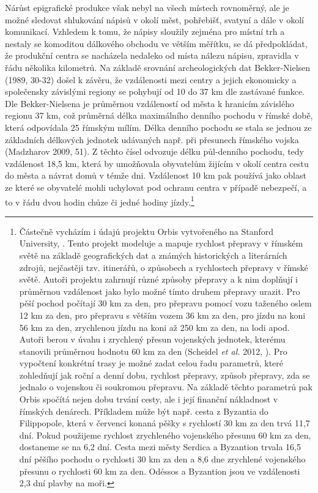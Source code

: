 Nárůst epigrafické produkce však nebyl na všech místech rovnoměrný, ale je možné sledovat shlukování nápisů v okolí měst, pohřebišť, svatyní a dále v okolí komunikací. Vzhledem k tomu, že nápisy sloužily zejména pro místní trh a nestaly se komoditou dálkového obchodu ve větším měřítku, se dá předpokládat, že produkční centra se nacházela nedaleko od místa nálezu nápisu, zpravidla v řádu několika kilometrů. Na základě srovnání archeologických dat Bekker-Nielsen (1989, 30-32) došel k závěru, že vzdálenosti mezi centry a jejich ekonomicky a společensky závislými regiony se pohybují od 10 do 37 km dle zastávané funkce. Dle Bekker-Nielsena je průměrnou vzdáleností od města k hranicím závislého regionu 37 km, což průměrná délka maximálního denního pochodu v římské době, která odpovídala 25 římským mílím. Délka denního pochodu se stala se jednou ze základních délkových jednotek udávaných např. při přesunech římského vojska (Madzharov 2009, 51). Z těchto čísel odvozuje délku půl-denního pochodu, tedy vzdálenost 18,5 km, která by umožňovala obyvatelům žijícím v okolí centra cestu do města a návrat domů v témže dni. Vzdálenost 10 km pak používá jako oblast ze které se obyvatelé mohli uchylovat pod ochranu centra v případě nebezpečí, a to v řádu dvou hodin chůze či jedné hodiny jízdy.\footnote{Částečně vycházím i údajů projektu Orbis vytvořeného na Stanford University, \from[url22]. Tento projekt modeluje a mapuje rychlost přepravy v římském světě na základě geografických dat a známých historických a literárních zdrojů, nejčastěji tzv. itinerářů, o způsobech a rychlostech přepravy v římské světě. Autoři projektu zahrnují různé způsoby přepravy a k nim doplňují i průměrnou vzdálenost jako bylo možné tímto druhem přepravy urazit. Pro pěší pochod počítají 30 km za den, pro přepravu pomocí vozu taženého oslem 12 km za den, pro přepravu s větším vozem 36 km za den, pro jízdu na koni 56 km za den, zrychlenou jízdu na koni až 250 km za den, na lodi apod. Autoři berou v úvahu i zrychlený přesun vojenských jednotek, kterému stanovili průměrnou hodnotu 60 km za den (Scheidel {\em et al.} 2012, \from[url23]). Pro vypočtení konkrétní trasy je možné zadat celou řadu parametrů, které zohledňují jak roční a denní dobu, rychlost přepravy, způsob přepravy, zda se jednalo o vojenskou či soukromou přepravu. Na základě těchto parametrů pak Orbis spočítá nejen dobu trvání cesty, ale i její finanční nákladnost v římských denárech. Příkladem může být např. cesta z Byzantia do Filippopole, která v červenci konaná pěšky s rychlostí 30 km za den trvá 11,7 dní. Pokud použijeme rychlost zrychleného vojenského přesunu 60 km za den, dostaneme se na 6,2 dní. Cesta mezi městy Serdica a Byzantion trvala 16,5 dní pěšího pochodu o rychlosti 30 km za den a 8,6 dne zrychlené vojenského přesunu o rychlosti 60 km za den. Odéssos a Byzantion jsou ve vzdálenosti 2,3 dní plavby na moři.}

